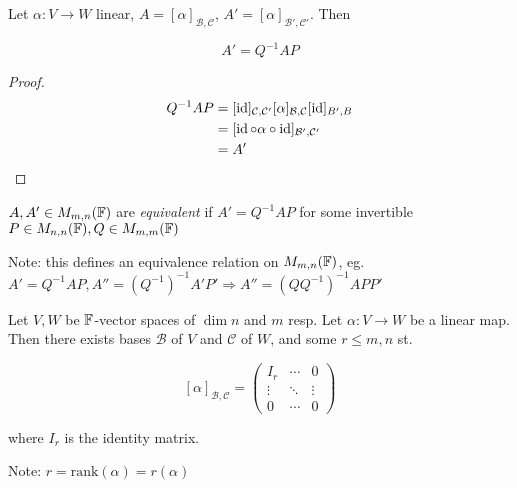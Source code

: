 \documentclass[a4paper]{article}
\begin{document}
\begin{prop} 
	Let $ \alpha : V \to W $ linear, $ A = [\alpha]_{\mathcal{B},\mathcal{C}} $, $ A' = [\alpha]_{\mathcal{B}',\mathcal{C}'}  $. Then
	
	\[ A' = Q^{-1} A P \]
\end{prop}

\begin{proof}
	\begin{align*}
	Q^{-1} A P & = [\operatorname{id}]_{\mathcal{C},\mathcal{C'}} [\alpha]_{\mathcal{B},\mathcal{C}} [\operatorname{id}]_{B',B}  \\
	& = [\operatorname{id} \circ \alpha \circ \operatorname{id} ]_{\mathcal{B}',\mathcal{C}'} \\
	& = A'
	\end{align*}
\end{proof}

\begin{defi}
	$ A,A' \in M_{m,n}(\mathbb{F}) $ are \emph{equivalent} if $ A' = Q^{-1} A P $ for some invertible $ P \in M_{n,n}(\mathbb{F}), Q \in 	M_{m,m} (\mathbb{F}) $
\end{defi}

Note: this defines an equivalence relation on $ M_{m,n}(\mathbb{F}) $, eg. $ A' = Q^{-1} A P, A'' = (Q^{-1})^{-1} A' P' \Rightarrow A'' = (Q Q^{-1})^{-1} A P P' $


\begin{prop} 
	Let $ V,W $ be $ \mathbb{F} $-vector spaces of $ \dim n $ and $ m $ resp. Let $ \alpha : V \to W $ be a linear map. Then there exists bases $ \mathcal{B} $ of $ V $ and $ \mathcal{C} $ of $ W $, and some $ r \leq m, n $ st. 
	
		\[ [\alpha]_{\mathcal{B},\mathcal{C}}  = \begin{pmatrix}
	I_{r} & \cdots & 0 \\
	\vdots & \ddots & \vdots \\
	0 & \cdots & 0  
	\end{pmatrix}\]
	
	where $ I_{r} $ is the identity matrix. 
	
	Note: $ r = \text{rank}(\alpha) = r(\alpha) $
	
\end{prop}
	
\end{document}
